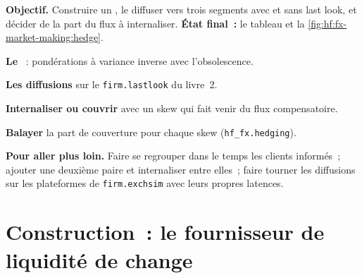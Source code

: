 \begin{tutorial}
\textbf{Objectif.} Construire un , le diffuser vers trois segments avec et sans last look, et décider de la part du flux à internaliser.
\textbf{État final~:} le tableau et la \cref{fig:hf:fx-market-making:hedge}.
\begin{tutsteps}
\item \textbf{Le }~: pondérations à variance inverse avec l'obsolescence.
\label{lst:hf:fx-market-making:fair}
\item \textbf{Les diffusions} sur le \texttt{firm.lastlook} du livre~2.
\label{lst:hf:fx-market-making:stream}
\item \textbf{Internaliser ou couvrir} avec un skew qui fait venir du flux compensatoire.
\label{lst:hf:fx-market-making:internalise}
\item \textbf{Balayer} la part de couverture pour chaque skew (\texttt{hf\_fx.hedging}).
\end{tutsteps}
\textbf{Pour aller plus loin.} Faire se regrouper dans le temps les clients informés~; ajouter une deuxième paire et internaliser entre elles~; faire tourner les diffusions sur
les plateformes de \texttt{firm.exchsim} avec leurs propres latences.
\end{tutorial}

\section{Construction~: le fournisseur de liquidité de change}\label{bld:hf:fx-market-making:fxlp}

